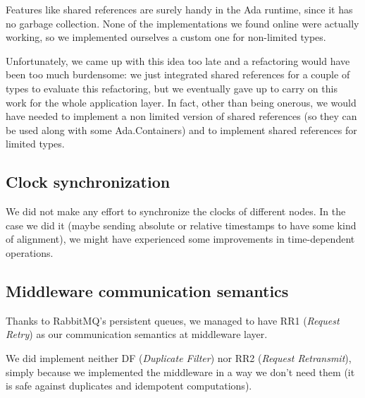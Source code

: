 Features like shared references are surely handy in the Ada runtime, since it
has no garbage collection. None of the implementations we found online were
actually working, so we implemented ourselves a custom one for non-limited
types.

Unfortunately, we came up with this idea too late and a refactoring would have
been too much burdensome: we just integrated shared references for a couple of
types to evaluate this refactoring, but we eventually gave up to carry on this
work for the whole application layer.
In fact, other than being onerous, we would have needed to implement a non
limited version of shared references (so they can be used along with some
Ada.Containers) and to implement shared references for limited types.

\subsection{Clock synchronization}
We did not make any effort to synchronize the clocks of different nodes.
In the case we did it (maybe sending absolute or relative timestamps to have 
some kind of alignment), we might have experienced some improvements in
time-dependent operations.

\subsection{Middleware communication semantics}
Thanks to RabbitMQ's persistent queues, we managed to have RR1
(\textit{Request Retry}) as our communication semantics at middleware layer.

We did implement neither DF (\textit{Duplicate Filter}) nor RR2
(\textit{Request Retransmit}), simply because we implemented the middleware in
a way we don't need them (it is safe against duplicates and idempotent
computations).
